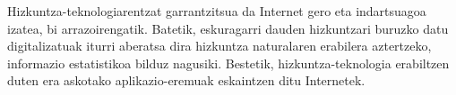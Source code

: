 \begin{multicols}{2}

Hizkuntza-teknologiarentzat garrantzitsua da Internet gero eta indartsuagoa izatea, bi arrazoirengatik. Batetik, eskuragarri dauden hizkuntzari buruzko datu digitalizatuak iturri aberatsa dira hizkuntza naturalaren erabilera aztertzeko, informazio estatistikoa bilduz nagusiki. Bestetik, hizkuntza-teknologia erabiltzen duten era askotako aplikazio-eremuak eskaintzen ditu Internetek. 

\end{multicols}

\clearpage



